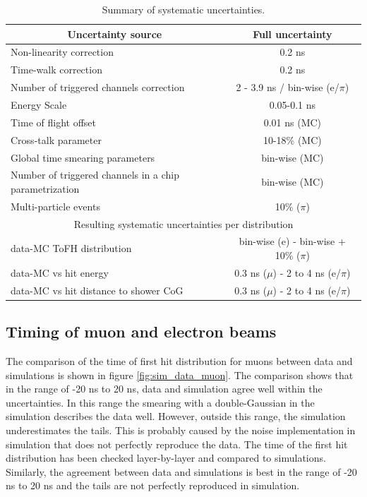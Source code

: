 \documentclass{JINST}
\begin{document}
\begin{table}[htb!]
  \centering
  \caption{Summary of systematic uncertainties.}
  \label{table:time_syst}
  \begin{tabular}{@{} lc @{}}
    \toprule
    \multicolumn{1}{c}{Uncertainty source} & Full uncertainty \\
    \midrule
    Non-linearity correction & 0.2 ns \\
    Time-walk correction & 0.2 ns \\
    Number of triggered channels correction & 2 - 3.9 ns / bin-wise (e/$\pi$)\\
    Energy Scale & 0.05-0.1 ns \\
    Time of flight offset & 0.01 ns (MC) \\
    Cross-talk parameter & 10-18\% (MC)\\
    Global time smearing parameters & bin-wise (MC)\\
    Number of triggered channels in a chip parametrization & bin-wise (MC)\\
    Multi-particle events & 10\% ($\pi$) \\
    \midrule
    \midrule
    \multicolumn{2}{c}{Resulting systematic uncertainties per distribution} \\
    \midrule
    data-MC ToFH distribution & bin-wise (e) - bin-wise + 10\% ($\pi$) \\
    data-MC vs hit energy & 0.3 ns ($\mu$) - 2 to 4 ns (e/$\pi$)\\
    data-MC vs hit distance to shower CoG & 0.3 ns ($\mu$) - 2 to 4 ns (e/$\pi$)\\
    \bottomrule
  \end{tabular}
\end{table}

\subsection{Timing of muon and electron beams}

The comparison of the time of first hit distribution for muons between data and simulations is shown in figure \ref{fig:sim_data_muon}. The comparison shows that in the range of -20 ns to 20 ns, data and simulation agree well within the uncertainties. In this range the smearing with a double-Gaussian in the simulation describes the data well. However, outside this range, the simulation underestimates the tails. This is probably caused by the noise implementation in simulation that does not perfectly reproduce the data. The time of the first hit distribution has been checked layer-by-layer and compared to simulations. Similarly, the agreement between data and simulations is best in the range of -20 ns to 20 ns and the tails are not perfectly reproduced in simulation.
\end{document}
